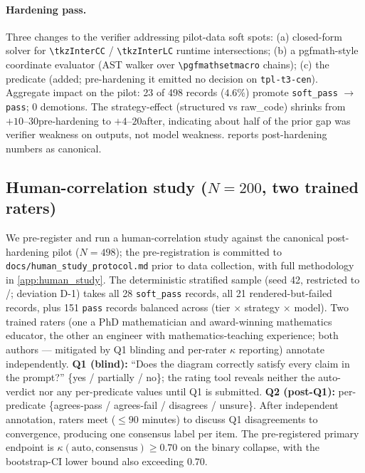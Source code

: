 \paragraph{Hardening pass.}
Three changes to the verifier addressing pilot-data soft spots: (a) closed-form solver for \texttt{\textbackslash tkzInterCC} / \texttt{\textbackslash tkzInterLC} runtime intersections; (b) a pgfmath-style coordinate evaluator (AST walker over \texttt{\textbackslash pgfmathsetmacro} chains); (c) the  predicate (added; pre-hardening it emitted no decision on \texttt{tpl-t3-cen}).
Aggregate impact on the pilot: 23 of 498 records ($4.6\%$) promote \texttt{soft\_pass} $\to$ \texttt{pass}; 0 demotions.
The strategy-effect (structured vs raw\_code) shrinks from $+10$--$30$\pp pre-hardening to $+4$--$20$\pp after, indicating about half of the prior gap was verifier weakness on \rawcode outputs, not model weakness.
 reports post-hardening numbers as canonical.

\subsection{Human-correlation study ($N{=}200$, two trained raters)}
\label{ssec:human}

We pre-register and run a human-correlation study against the canonical post-hardening pilot ($N{=}498$); the pre-registration is committed to \texttt{docs/human\_study\_protocol.md} prior to data collection, with full methodology in \cref{app:human_study}.
The deterministic stratified sample (seed 42, restricted to {\rawcode}/{\structured}; deviation D-1) takes all 28 \texttt{soft\_pass} records, all 21 rendered-but-failed records, plus 151 \texttt{pass} records balanced across (tier $\times$ strategy $\times$ model).
Two trained raters (one a PhD mathematician and award-winning mathematics educator, the other an engineer with mathematics-teaching experience; both authors --- mitigated by Q1 blinding and per-rater $\kappa$ reporting) annotate independently.
\textbf{Q1 (blind):} ``Does the diagram correctly satisfy every claim in the prompt?'' \{yes / partially / no\}; the rating tool reveals neither the auto-verdict nor any per-predicate values until Q1 is submitted.
\textbf{Q2 (post-Q1):} per-predicate \{agrees-pass / agrees-fail / disagrees / unsure\}.
After independent annotation, raters meet ($\leq 90$ minutes) to discuss Q1 disagreements to convergence, producing one consensus label per item.
The pre-registered primary endpoint is $\kappa(\text{auto}, \text{consensus}) \geq 0.70$ on the binary collapse, with the bootstrap-CI lower bound also exceeding $0.70$.

